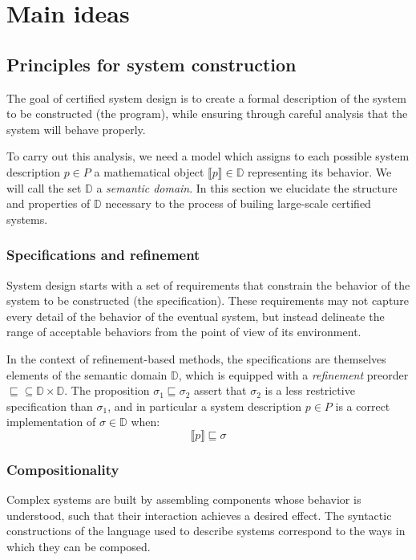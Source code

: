 \section{Main ideas}

\subsection{Principles for system construction}

The goal of certified system design is
to create a formal description of
the system to be constructed (the program),
while ensuring through careful analysis that the system
will behave properly.

To carry out this analysis,
we need a model
which assigns to each possible system description $p \in P$
a mathematical object $\llbracket p \rrbracket \in \mathbb{D}$
representing its behavior.
We will call the set $\mathbb{D}$ a \emph{semantic domain}.
In this section we elucidate
the structure and properties of $\mathbb{D}$
necessary to the process of builing
large-scale certified systems.

\subsubsection{Specifications and refinement}

System design starts with a set of requirements
that constrain the behavior of the system to be constructed
(the specification).
These requirements may not capture every detail
of the behavior of the eventual system,
but instead delineate the range of acceptable behaviors
from the point of view of its environment.

In the context of refinement-based methods,
the specifications are themselves elements of
the semantic domain $\mathbb{D}$,
which is equipped with a \emph{refinement} preorder
${\sqsubseteq} \subseteq \mathbb{D} \times \mathbb{D}$.
The proposition $\sigma_1 \sqsubseteq \sigma_2$
assert that $\sigma_2$ is a less restrictive specification than $\sigma_1$,
and in particular a system description $p \in P$ is a correct implementation
of $\sigma \in \mathbb{D}$ when:
\[ \llbracket p \rrbracket \sqsubseteq \sigma \]

\subsubsection{Compositionality}

Complex systems are built by assembling components
whose behavior is understood,
such that their interaction achieves a desired effect.
The syntactic constructions of
the language used to describe systems
correspond to the ways in which they can be composed.

